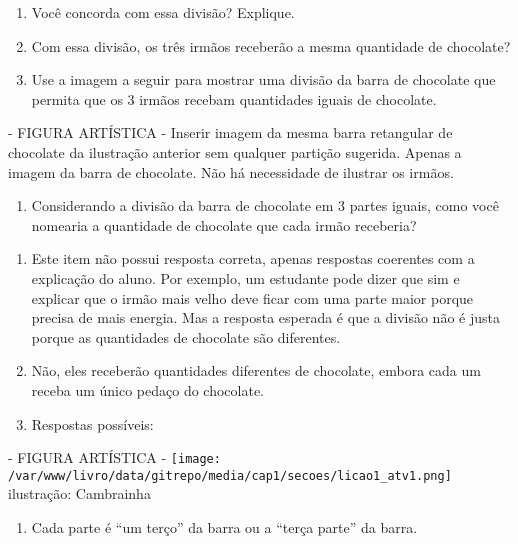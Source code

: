 \documentclass[a4paper,12pt,twoside]{book}
\begin{document}
\begin{enumerate} [\quad a)] %
  \item     Você concorda com essa divisão? Explique.
  \item     Com essa divisão, os três irmãos receberão a mesma quantidade de chocolate?
  \item     Use a imagem a seguir para mostrar uma divisão da barra de chocolate que permita que os 3 irmãos recebam quantidades iguais de chocolate. 
\end{enumerate} %
\begin{imagem*}[breakable]{}{}    - FIGURA ARTÍSTICA - Inserir imagem da mesma barra retangular de chocolate da ilustração anterior sem qualquer partição sugerida. Apenas a imagem da barra de chocolate. Não há necessidade de ilustrar os irmãos.\end{imagem*}
\begin{enumerate} [\quad a)] %
  \item     Considerando a divisão da barra de chocolate em 3 partes iguais, como você nomearia a quantidade de chocolate que cada irmão receberia? 
\end{enumerate} %



\begin{resposta*}[breakable]{}{}  
\begin{enumerate} [\quad a)] %
    \item       Este item não possui resposta correta, apenas respostas coerentes com a explicação do aluno. Por exemplo, um estudante pode dizer que sim e explicar que o irmão mais velho deve ficar com uma parte maior porque precisa de mais energia. Mas a resposta esperada é que a divisão não é justa porque as quantidades de chocolate são diferentes.
    \item       Não, eles receberão quantidades diferentes de chocolate, embora cada um receba um único pedaço do chocolate.
    \item       Respostas possíveis:
\end{enumerate} %
  \begin{imagem*}[breakable]{}{}      - FIGURA ARTÍSTICA -    \mbox{} \newline              \texttt{[image: /var/www/livro/data/gitrepo/media/cap1/secoes/licao1\_atv1.png]}    \mbox{} \newline      ilustração: Cambrainha   \end{imagem*}  
\begin{enumerate} [\quad a)] %
    \item       Cada parte é       ``um terço''       da barra ou a       ``terça parte''       da barra.
\end{enumerate} %
  
\end{resposta*}
\end{document}
